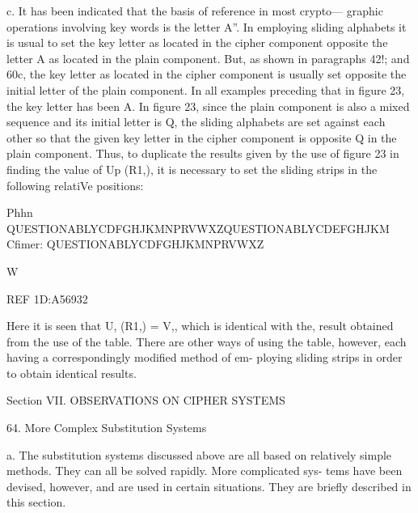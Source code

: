 {c. It has been indicated that the basis of reference in most crypto—
graphic operations involving key words is the letter A”. In employing
sliding alphabets it is usual to set the key letter as located in the cipher
component opposite the letter A as located in the plain component. But,
as shown in paragraphs 42!; and 60c, the key letter as located in the
cipher component is usually set opposite the initial letter of the plain
component. In all examples preceding that in ﬁgure 23, the key letter has
been A. In ﬁgure 23, since the plain component is also a mixed sequence
and its initial letter is Q, the sliding alphabets are set against each other
so that the given key letter in the cipher component is opposite Q in the
plain component. Thus, to duplicate the results given by the use of ﬁgure
23 in ﬁnding the value of Up (R1,), it is necessary to set the sliding strips
in the following relatiVe positions:

Phhn QUESTIONABLYCDFGHJKMNPRVWXZQUESTIONABLYCDEFGHJKM
Cﬁmer: QUESTIONABLYCDFGHJKMNPRVWXZ

W

 

 

 

 

 

REF 1D:A56932

Here it is seen that U, (R1,) = V,, which is identical with the, result
obtained from the use of the table. There are other ways of using the
table, however, each having a correspondingly modiﬁed method of em-
ploying sliding strips in order to obtain identical results.

Section VII. OBSERVATIONS ON CIPHER SYSTEMS

64. More Complex Substitution Systems

a. The substitution systems discussed above are all based on relatively
simple methods. They can all be solved rapidly. More complicated sys-
tems have been devised, however, and are used in certain situations.
They are brieﬂy described in this section.

}
